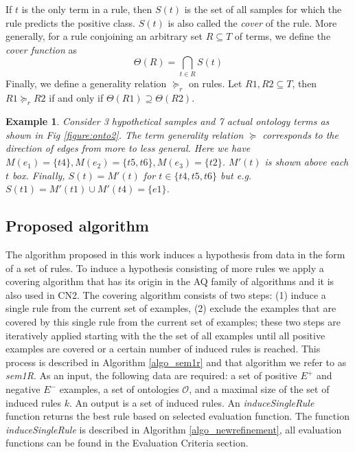 \documentclass{bmcart}
\newtheorem{example}{Example}
\begin{document}
If $t$ is the only term in a rule, then $S(t)$ is the set of all samples for which the rule predicts the positive class. $S(t)$ is also called the {\em cover} of the rule. More generally, for a rule conjoining an arbitrary set $R \subseteq T$ of terms, we define the {\em cover function} as
\begin{equation}
	\Theta(R) = \bigcap_{t \in R} S(t)
\end{equation}
Finally, we define a generality relation $\succeq_r$ on rules. Let $R1, R2 \subseteq T$, then $R1 \succeq_r R2$ if and only if $\Theta(R1) \supseteq \Theta(R2)$.


\begin{example}\label{ex:onto}
	Consider 3 hypothetical samples and 7 actual ontology terms as shown in Fig \ref{figure:onto2}. The term generality relation $\succeq$ corresponds to the direction of edges from more to less general. Here we have $M(e_1) = \{t4\}, M(e_2) = \{t5, t6\}, M(e_3) = \{t2\}$. $M'(t)$ is shown above each $t$ box. Finally, $S(t)=M'(t)$ for $t \in \{t4,t5,t6\}$ but e.g. $S(t1) = M'(t1) \cup M'(t4) = \{e1\}$.
\end{example}

\subsection*{Proposed algorithm} \label{section:proposedalg}

The algorithm proposed in this work induces a hypothesis from data in the form of a set of rules. To induce a hypothesis consisting of more rules we apply a covering algorithm that has its origin in the AQ family of algorithms \cite{michalski1969quasi} and it is also used in CN2. The covering algorithm consists of two steps: (1) induce a single rule from the current set of examples, (2) exclude the examples that are covered by this single rule from the current set of examples; these two steps are iteratively applied starting with the the set of all examples until all positive examples are covered or a certain number of induced rules is reached. This process is described in Algorithm \ref{algo_sem1r} and that algorithm we refer to as \emph{sem1R}. As an input, the following data are required: a set of positive $E^{+}$ and negative $E^{-}$ examples, a set of ontologies $\mathcal{O}$, and a maximal size of the set of induced rules $k$. An output is a set of induced rules. An \emph{induceSingleRule} function returns the best rule based on selected evaluation function. The function \emph{induceSingleRule} is described in Algorithm \ref{algo_newrefinement}, all evaluation functions can be found in the Evaluation Criteria section.
\end{document}
